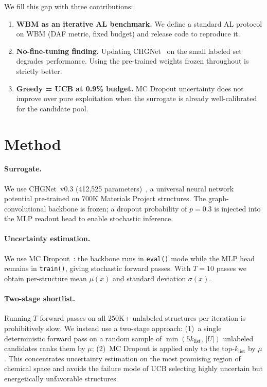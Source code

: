 \documentclass{article}
\begin{document}
We fill this gap with three contributions:
\begin{enumerate}
  \item \textbf{WBM as an iterative AL benchmark.}
    We define a standard AL protocol on WBM (DAF metric, fixed budget) and
    release code to reproduce it.
  \item \textbf{No-fine-tuning finding.}
    Updating CHGNet~\cite{deng2023chgnet} on the small labeled set degrades
    performance.  Using the pre-trained weights frozen throughout is strictly
    better.
  \item \textbf{Greedy = UCB at 0.9\% budget.}
    MC Dropout uncertainty does not improve over pure exploitation when the
    surrogate is already well-calibrated for the candidate pool.
\end{enumerate}

\section{Method}

\paragraph{Surrogate.}
We use CHGNet~v0.3 (412{,}525 parameters)~\cite{deng2023chgnet}, a universal
neural network potential pre-trained on 700K Materials Project structures.
The graph-convolutional backbone is frozen; a dropout probability of $p{=}0.3$
is injected into the MLP readout head to enable stochastic inference.

\paragraph{Uncertainty estimation.}
We use MC Dropout~\cite{gal2016dropout}: the backbone runs in \texttt{eval()}
mode while the MLP head remains in \texttt{train()}, giving stochastic forward
passes.  With $T{=}10$ passes we obtain per-structure mean $\mu(x)$ and standard
deviation $\sigma(x)$.

\paragraph{Two-stage shortlist.}
Running $T$ forward passes on all 250K+ unlabeled structures per iteration is
prohibitively slow.
We instead use a two-stage approach:
(1)~a single deterministic forward pass on a random sample of
$\min(5k_\text{list},\,|U|)$ unlabeled candidates ranks them by $\mu$;
(2)~MC Dropout is applied only to the top-$k_\text{list}$ by $\mu$.
This concentrates uncertainty estimation on the most promising region of chemical
space and avoids the failure mode of UCB selecting highly uncertain but
energetically unfavorable structures.
\end{document}
